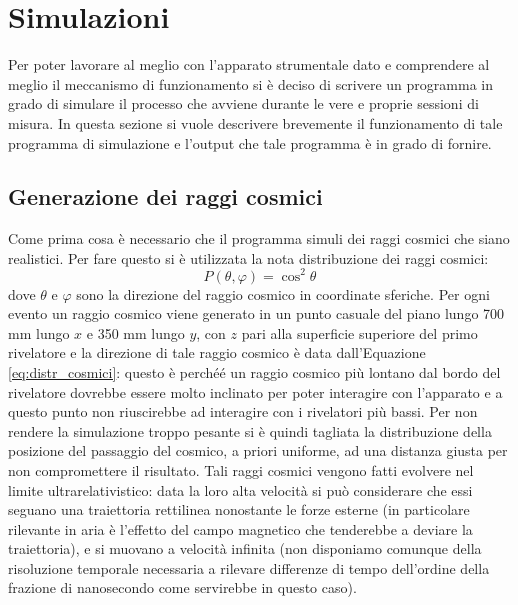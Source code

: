 \section{Simulazioni}
Per poter lavorare al meglio con l'apparato strumentale dato e comprendere al meglio il meccanismo di funzionamento si è deciso di scrivere un programma in grado di simulare
il processo che avviene durante le vere e proprie sessioni di misura. In questa sezione si vuole descrivere brevemente il funzionamento di tale programma di simulazione e
l'output che tale programma è in grado di fornire.
\subsection{Generazione dei raggi cosmici}
Come prima cosa è necessario che il programma simuli dei raggi cosmici che siano realistici. Per fare questo si è utilizzata la nota distribuzione dei raggi cosmici:
\begin{equation}
	P\left(\theta, \varphi\right) = \cos^2{\theta}
	\label{eq:distr_cosmici}
\end{equation}
dove $\theta$ e $\varphi$ sono la direzione del raggio cosmico in coordinate sferiche.
Per ogni evento un raggio cosmico viene generato in un punto casuale del piano lungo 700 mm lungo $x$ e 350 mm lungo $y$, con $z$ pari alla superficie superiore del primo rivelatore e la direzione di tale raggio cosmico è data dall'Equazione \ref{eq:distr_cosmici}: questo \`e perché\'e un raggio cosmico pi\`u lontano dal bordo del rivelatore dovrebbe essere molto inclinato per poter interagire con l'apparato e a questo punto non riuscirebbe ad interagire con i rivelatori pi\`u bassi. Per non rendere la simulazione troppo pesante si \`e quindi tagliata la distribuzione della posizione del passaggio del cosmico, a priori uniforme, ad una distanza giusta per non compromettere il risultato.
Tali raggi cosmici vengono fatti evolvere nel limite ultrarelativistico: data la loro alta velocità si può considerare che essi seguano una traiettoria rettilinea nonostante
le forze esterne (in particolare rilevante in aria è l'effetto del campo magnetico che tenderebbe a deviare la traiettoria), e si muovano a velocità infinita (non disponiamo comunque della risoluzione temporale necessaria a rilevare differenze di tempo dell'ordine della frazione di nanosecondo come servirebbe in questo caso).

